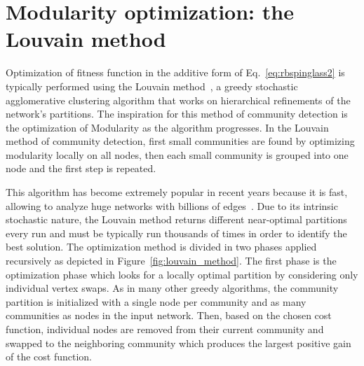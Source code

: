 \section{Modularity optimization: the Louvain method}\label{sec:louvain_method}
Optimization of fitness function in the additive form of Eq.~\ref{eq:rbspinglass2} is typically performed using the Louvain method~\cite{blondel2008}, a greedy stochastic agglomerative clustering algorithm that works on hierarchical refinements of the network's partitions. The inspiration for this method of community detection is the optimization of Modularity as the algorithm progresses. In the Louvain method of community detection, first small communities are found by optimizing modularity locally on all nodes, then each small community is grouped into one node and the first step is repeated.

This algorithm has become extremely popular in recent years because it is fast, allowing to analyze huge networks with billions of edges~\cite{lancichinetti2009}.
Due to its intrinsic stochastic nature, the Louvain method returns different near-optimal partitions every run and must be typically run thousands of times in order to identify the best solution.
The optimization method is divided in two phases applied recursively as depicted in Figure~\ref{fig:louvain_method}. The first phase is the optimization phase which looks for a locally optimal partition by considering only individual vertex swaps. As in many other greedy algorithms, the community partition is initialized with a single node per community and as many communities as nodes in the input network. Then, based on the chosen cost function, individual nodes are removed from their current community and swapped to the neighboring community which produces the largest positive gain of the cost function.

